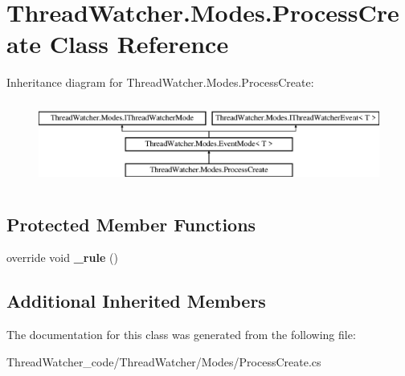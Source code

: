 \hypertarget{class_thread_watcher_1_1_modes_1_1_process_create}{\section{Thread\+Watcher.\+Modes.\+Process\+Create Class Reference}
\label{class_thread_watcher_1_1_modes_1_1_process_create}
}
Inheritance diagram for Thread\+Watcher.\+Modes.\+Process\+Create\+:\begin{figure}[H]
\begin{center}
\leavevmode
\includegraphics[height=2.745098cm]{class_thread_watcher_1_1_modes_1_1_process_create}
\end{center}
\end{figure}
\subsection*{Protected Member Functions}
\begin{DoxyCompactItemize}
\item 
\hypertarget{class_thread_watcher_1_1_modes_1_1_process_create_a59fea2d49b3b254930232fab0d9ce932}{override void {\bfseries \+\_\+rule} ()}\label{class_thread_watcher_1_1_modes_1_1_process_create_a59fea2d49b3b254930232fab0d9ce932}

\end{DoxyCompactItemize}
\subsection*{Additional Inherited Members}


The documentation for this class was generated from the following file\+:\begin{DoxyCompactItemize}
\item 
Thread\+Watcher\+\_\+code/\+Thread\+Watcher/\+Modes/Process\+Create.\+cs\end{DoxyCompactItemize}
